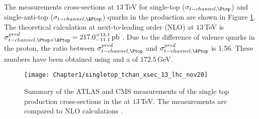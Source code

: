 The measurements cross-sections at $13\,$TeV for single-top ($\sigma_{\tchannel, \Ptop}$) 
and single-anti-top ($\sigma_{\tchannel, \APtop}$) quarks in the \tchannel production are 
shown in Figure \ref{fig:Chap1:top:singletop:tchannel_CrossSection}.
The theoretical calculation at next-to-leading order
(NLO) at $13\,$TeV is $\sigma^{pred}_{\tchannel, \Ptop + \APtop }= 217.0^{+13.1}_{-11.1} \,\textrm{pb}$
\cite{CMS:2018lgn}. Due to the difference of valence quarks in the proton, the ratio 
between $\sigma^{pred}_{\tchannel, \Ptop}$ and $\sigma^{pred}_{\tchannel, \APtop}$ is 1.56. These numbers 
have been obtained using \HATHOR[2.1] \cite{Kant:2014oha}\cite{Aliev:2010zk} and a \mtop of $172.5\,$GeV.


\begin{figure}
    \centering
    \texttt{[image: Chapter1/singletop\_tchan\_xsec\_13\_lhc\_nov20]}
    \caption{Summary of the ATLAS and CMS measurements of the single top production cross-sections in the \tchannel at $13\,$TeV. The measurements are compared to NLO calculations \cite{ATLAS:2022uqj}.}
    \label{fig:Chap1:top:singletop:tchannel_CrossSection}
\end{figure}


